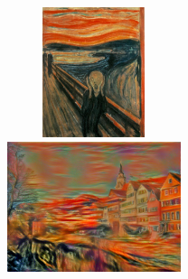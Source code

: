 \documentclass{article}
\begin{document}
\begin{figure}
    \begin{minipage}{0.45\linewidth}
    \centering
    \includegraphics[width=0.9\textwidth,height=1.5in]{img/artworks/the-scream}
    \end{minipage}
    \begin{minipage}{0.45\linewidth}
    \centering
    \includegraphics[width=0.9\textwidth,height=1.5in]{img/transfer/the-scream}
    \end{minipage}

\end{figure}



\begin{acronym}
\end{acronym}
\end{document}
